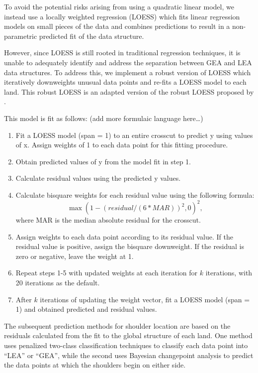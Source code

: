 \documentclass[12pt]{article}
\begin{document}
To avoid the potential risks arising from using a quadratic linear
model, we instead use a locally weighted regression (LOESS) which fits
linear regression models on small pieces of the data and combines
predictions to result in a non-parametric predicted fit of the data
structure.

However, since LOESS is still rooted in traditional regression
techniques, it is unable to adequately identify and address the
separation between GEA and LEA data structures. To address this, we
implement a robust version of LOESS which iteratively downweights
unusual data points and re-fits a LOESS model to each land. This robust
LOESS is an adapted version of the robust LOESS proposed by
\cite{Cleveland1}.

This model is fit as follows: (add more formulaic language here\ldots{})

\begin{enumerate}

\item Fit a LOESS model (span = 1) to an entire crosscut to predict y using values of x. Assign weights of 1 to each data point for this fitting procedure.  
\item Obtain predicted values of y from the model fit in step 1.  
\item Calculate residual values using the predicted y values.  
\item Calculate bisquare weights for each residual value using the following formula:  
$$\max(1 - (residual/(6*MAR))^2, 0)^2,$$   where MAR is the median absolute residual for the crosscut.  
\item Assign weights to each data point according to its residual value. If the residual value is positive, assign the bisquare downweight. If the residual is zero or negative, leave the weight at 1.  
\item Repeat steps 1-5 with updated weights at each iteration for $k$ iterations, with 20 iterations as the default.  
\item After $k$ iterations of updating the weight vector, fit a LOESS model (span = 1) and obtained predicted and residual values.  

\end{enumerate}

The subsequent prediction methods for shoulder location are based on the
residuals calculated from the fit to the global structure of each land.
One method uses penalized two-class classification techniques to
classify each data point into ``LEA'' or ``GEA'', while the second uses
Bayesian changepoint analysis to predict the data points at which the
shoulders begin on either side.
\end{document}
